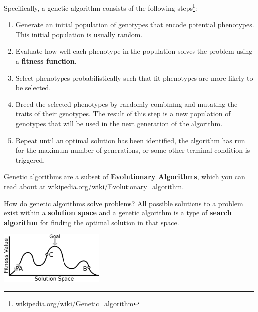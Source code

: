 \documentclass[10pt]{book}
\begin{document}
Specifically, a genetic algorithm consists of the following 
steps\footnote{\url{wikipedia.org/wiki/Genetic_algorithm}}:

\begin{enumerate}
  \item Generate an initial population of genotypes that encode potential
  phenotypes. This initial population is usually random.

  \item Evaluate how well each phenotype in the population solves the problem using a 
  {\bf fitness function}.

  \item Select phenotypes probabilistically such that fit phenotypes 
  are more likely to be selected.

  \item Breed the selected phenotypes by randomly combining and mutating the traits of their genotypes. 
  The result of this step is a new population of genotypes that will be used in
  the next generation of the algorithm.

  \item Repeat until an optimal solution has been identified, the algorithm has run for the maximum 
  number of generations, or some other terminal condition is triggered.

\end{enumerate}

Genetic algorithms are a subset of {\bf Evolutionary Algorithms}, which you can
read about at \url{wikipedia.org/wiki/Evolutionary_algorithm}.


How do genetic algorithms solve problems? All possible solutions to a problem
exist within a {\bf solution space} and a genetic algorithm is a type of
{\bf search algorithm} for finding the optimal solution in that space.

\beforefig
\centerline{\includegraphics[width=2in]{./figs/GeneticAlgStateSpace.eps}}
\afterfig
\end{document}
